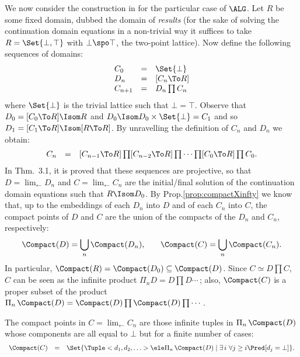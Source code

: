 \documentclass{lmcs}
\begin{document}
We now consider the construction in \cite{Streicher-Reus'98} for the particular case of $\ALG$. Let $R$ be some fixed domain, dubbed the domain of \emph{results} (for the sake of solving the continuation domain equations in a non-trivial way it suffices to take $R = \Set{\bot,\top}$ with $\bot \spo \top $, the two-point lattice). Now define the following sequences of domains:
%
 \[ \begin{array}{lll}
C_0 &=& \Set{\bot} \\
D_n &=& [C_n \To R] \\
C_{n+1} &=& D_n\prod C_n 
 \end{array} \]
where $ \Set{\bot}$ is the trivial lattice such that $\bot = \top$. 
Observe that $D_0 = [C_0\To R] \Isom R $ and $ D_0 \Isom D_0 \times \Set{\bot} = C_1$ and so $D_1= [C_1 \To R] \Isom [R \To R]$. By unravelling the definition of $C_n$ and $D_n$ we obtain:
%
 \[ \begin{array}{rcl}
C_n	&=& 
[C_{n-1} \To R]\prod [C_{n-2} \To R]\prod \cdots\prod [C_0\To R]\prod C_0.
 \end{array} \]
In \cite{Streicher-Reus'98} Thm.~3.1, it is proved that these sequences are projective, so that $D = \lim_{\leftarrow} D_n$ and $C = \lim_{\leftarrow} C_n$ are the initial/final solution of the continuation domain equations such that $R \Isom D_0$.
By Prop.\skp\ref{prop:compactXinfty} we know that, up to the embeddings of each $D_n$ into $D$ and of each $C_n$ into $C$, the compact points of $D$ and $C$ are the union of the compacts of the $D_n$ and $C_n$, respectively:
 \begin{eqnarray} \label{eq:compactUnion}
 \Compact(D) = \bigcup_n \Compact(D_n), &\quad& \Compact(C) = \bigcup_n \Compact(C_n).
 \end{eqnarray}
In particular, $\Compact(R) = \Compact(D_0) \subseteq \Compact(D)$.
Since $C \simeq D\prod C$, $C$ can be seen as the infinite product $\Pi_n D = D\prod D \cdots \,$; also, $\Compact(C)$ is a proper subset of the product $\Pi_n \, \Compact(D) = \Compact(D)\prod \Compact(D)\prod \cdots$. 

 \begin{prop} \label{prop:compcats_of_C}
The compact points in $C = \lim_{\leftarrow} C_n$ are those infinite tuples in $\Pi_n \, \Compact(D)$ whose components are all equal to $\bot$ but for a finite number of cases:
%
 \[ \begin{array}{rcl}
\Compact(C) &=& \Set{\Tuple <d_1, d_2, \ldots > \ele \Pi_n \, \Compact(D) \mid \exists \,i \ \forall j\geq i \Pred[ d_j = \bot] }.
 \end{array} \]
 \end{prop}
\end{document}
